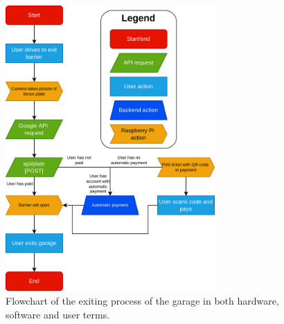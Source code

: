 \begin{appendices}
\begin{figure}[htp]
    \centering
    \includegraphics[width=8cm]{images/garage_exit.drawio.png}
    \caption{Flowchart of the exiting process of the garage in both hardware, software and user terms.}
    \label{fig:garage-exit}
\end{figure}


\end{appendices}
